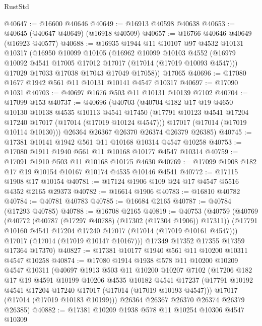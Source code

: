 \begin{lexlean}{RustStd}
\begin{coremodule}
{\begin{coremodule}
{{{{{{{{{{{{{{{{{{{{{{{{{{{{{{{{{{{{{{{{{{{{{{{{{{{{{{{@40647 := @16600 @40646
@40649 := @16913 @40598 @40638
@40653 := @40645 (@40647 @40649) (@16918 @40509)
@40657 := @16766 @40646 @40649 (@16923 @40577)
@40688 := @16935
    @1944
    @11
    @10107
    @97
    @4532
    @10131
    @10317
    (@16950
      @10099
      @10105
      (@16962
        @10099
        @10103
        @4552
        (@16979 @10092 @4541 @17005 @17012 @17017 (@17014 (@17019 @10093 @4547)))
        @17029
        @17033
        @17038
        @17043
        @17049
        @17058))
    @17065
@40696 := @17080 @1677 @1942 @561 @11 @10131 @10141 @4547 @10317
@40697 := @17090 @1031
@40703 := @40697 @1676 @503 @11 @10131 @10139 @7102
@40704 := @17099 @153
@40737 := @40696
    (@40703
      (@40704
        @182
        @17
        @19
        @4650
        @10130
        @10138
        @4535
        @10113
        @4541
        @17450
        (@17791 @10123 @4541 @17204 @17240 @17017 (@17014 (@17019 @10124 @4547)))
        @17017
        (@17014 (@17019 @10114 @10130)))
      @26364
      @26367
      @26370
      @26374
      @26379
      @26385)
@40745 := @17381 @10141 @1942 @561 @11 @10168 @10314 @4547 @10258
@40753 := @17080 @1911 @1940 @561 @11 @10168 @10177 @4547 @10314
@40759 := @17091 @1910 @503 @11 @10168 @10175 @4630
@40769 := @17099 @1908 @182 @17 @19 @10154 @10167 @10174 @4535 @10146 @4541
@40772 := @17115 @1908 @17 @10154
@40781 := @17124 @1906 @109 @24 @17 @4547 @5516 @4352 @2165 @29373
@40782 := @16614 @1906
@40783 := @16810 @40782
@40784 := @40781 @40783
@40785 := @16684 @2165
@40787 := @40784 (@17293 @40785)
@40788 := @16708 @2165
@40819 := @40753
    (@40759
      (@40769
        (@40772 (@40787 (@17297 @40788) (@17302 (@17304 @1906)) @17311))
        (@17791 @10160 @4541 @17204 @17240 @17017 (@17014 (@17019 @10161 @4547)))
        @17017
        (@17014 (@17019 @10147 @10167)))
      @17349
      @17352
      @17355
      @17359
      @17364
      @17370)
@40827 := @17381 @10177 @1940 @561 @11 @10200 @10311 @4547 @10258
@40874 := @17080
    @1914
    @1938
    @578
    @11
    @10200
    @10209
    @4547
    @10311
    (@40697
      @1913
      @503
      @11
      @10200
      @10207
      @7102
      (@17206
        @182
        @17
        @19
        @4591
        @10199
        @10206
        @4535
        @10182
        @4541
        @17237
        (@17791 @10192 @4541 @17204 @17240 @17017 (@17014 (@17019 @10193 @4547)))
        @17017
        (@17014 (@17019 @10183 @10199)))
      @26364
      @26367
      @26370
      @26374
      @26379
      @26385)
@40882 := @17381 @10209 @1938 @578 @11 @10254 @10306 @4547 @10309
}}}}}}}}}}}}}}}}}}}}}}}}}}}}}}}}}}}}}}}}}}}}}}}}}}}}}}}
\end{coremodule}}
\end{coremodule}
\end{lexlean}
